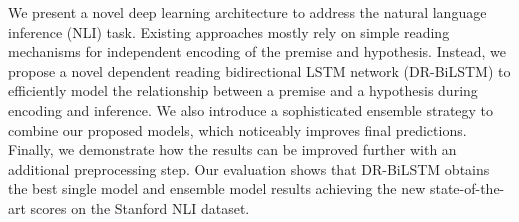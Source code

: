 We present a novel deep learning architecture to address the natural language inference (NLI) task. Existing approaches mostly rely on simple reading mechanisms for independent encoding of the premise and hypothesis. Instead, we propose a novel dependent reading bidirectional LSTM network (DR-BiLSTM) to efficiently model the relationship between a premise and a hypothesis during encoding and inference. We also introduce a sophisticated ensemble strategy to combine our proposed models, which noticeably improves final predictions. Finally, we demonstrate how the results can be improved further with an additional preprocessing step. Our evaluation shows that DR-BiLSTM obtains the best single model and ensemble model results achieving the new state-of-the-art scores on the Stanford NLI dataset.
